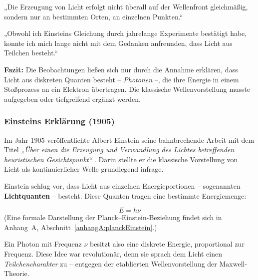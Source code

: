 \medskip
\begin{tcolorbox}[physikbox, title=Albert Einstein (1905)\textit{ \cite{einstein1905}} ]
	\label{die Erzeuguung von Licht}
	\small
	„Die Erzeugung von Licht erfolgt nicht überall auf der Wellenfront gleichmäßig, sondern nur an bestimmten Orten, an einzelnen Punkten.“
\end{tcolorbox}

\medskip
\begin{tcolorbox}[physikbox, title=Robert A. Millikan (1916)\textit{ \cite{millikan1916}}]
	\label{box:Robert A, Millikan}
	\small
	„Obwohl ich Einsteins Gleichung durch jahrelange Experimente bestätigt habe, konnte ich mich lange nicht mit dem Gedanken anfreunden, dass Licht aus Teilchen besteht.“
\end{tcolorbox}
\medskip
{}

\textbf{Fazit:} Die Beobachtungen ließen sich nur durch die Annahme erklären, dass Licht aus diskreten Quanten besteht – \emph{Photonen} –, die ihre Energie in einem Stoßprozess an ein Elektron übertragen. Die klassische Wellenvorstellung musste aufgegeben oder tiefgreifend ergänzt werden.
\subsubsection{Einsteins Erklärung (1905)}

Im Jahr 1905 veröffentlichte Albert Einstein seine bahnbrechende Arbeit mit dem Titel \textit{„Über einen die Erzeugung und Verwandlung des Lichtes betreffenden heuristischen Gesichtspunkt“} \cite{einstein1905}. Darin stellte er die klassische Vorstellung von Licht als kontinuierlicher Welle grundlegend infrage.

Einstein schlug vor, dass Licht aus einzelnen Energieportionen – sogenannten \textbf{Lichtquanten} – besteht. Diese Quanten tragen eine bestimmte Energiemenge:

\[
E = h \nu
\]
(Eine formale Darstellung der Planck–Einstein-Beziehung findet sich in Anhang~A, Abschnitt~\ref{anhangA:planckEinstein}.)

Ein Photon mit Frequenz \( \nu \) besitzt also eine diskrete Energie, proportional zur Frequenz. Diese Idee war revolutionär, denn sie sprach dem Licht einen \emph{Teilchencharakter} zu – entgegen der etablierten Wellenvorstellung der Maxwell-Theorie.

